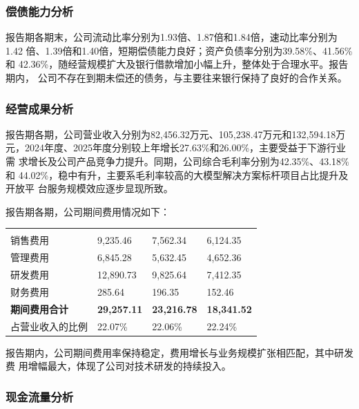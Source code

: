 \subsubsection{偿债能力分析}

报告期各期末，公司流动比率分别为1.93倍、1.87倍和1.84倍，速动比率分别为1.42
倍、1.39倍和1.40倍，短期偿债能力良好；资产负债率分别为39.58\%、41.56\%和
42.36\%，随经营规模扩大及银行借款增加小幅上升，整体处于合理水平。报告期内，
公司不存在到期未偿还的债务，与主要往来银行保持了良好的合作关系。

\subsubsection{经营成果分析}

报告期各期，公司营业收入分别为82,456.32万元、105,238.47万元和132,594.18万
元，2024年度、2025年度分别较上年增长27.63\%和26.00\%，主要受益于下游行业需
求增长及公司产品竞争力提升。同期，公司综合毛利率分别为42.35\%、43.18\%和
44.02\%，稳中有升，主要系毛利率较高的大模型解决方案标杆项目占比提升及开放平
台服务规模效应逐步显现所致。

报告期各期，公司期间费用情况如下：

\begin{gstab}
\begin{longtable}{|L{49mm}|R{29mm}|R{29mm}|R{29mm}|}
\hline
{} &  &  &  \\ \hline
\endfirsthead
\hline
{} &  &  &  \\ \hline
\endhead
销售费用 & 9,235.46 & 7,562.34 & 6,124.35 \\ \hline
管理费用 & 6,845.28 & 5,632.45 & 4,652.36 \\ \hline
研发费用 & 12,890.73 & 9,825.64 & 7,412.35 \\ \hline
财务费用 & 285.64 & 196.35 & 152.46 \\ \hline
{\bfseries 期间费用合计} & {\bfseries 29,257.11} & {\bfseries 23,216.78} & {\bfseries 18,341.52} \\ \hline
占营业收入的比例 & 22.07\% & 22.06\% & 22.24\% \\ \hline
\end{longtable}
\end{gstab}

报告期内，公司期间费用率保持稳定，费用增长与业务规模扩张相匹配，其中研发费
用增幅最大，体现了公司对技术研发的持续投入。

\subsubsection{现金流量分析}

